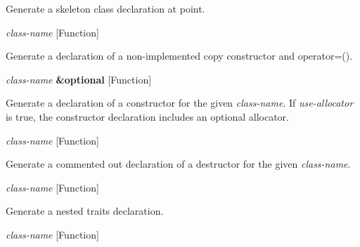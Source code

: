 \begin{doc-string}
Generate a skeleton class declaration at point.
\end{doc-string}

\vspace{1em}
\noindent
{}
\usebox{\funcname}\emph{class-name}
 \hfill [Function]

\begin{doc-string}
Generate a declaration of a non-implemented copy constructor and operator=().
\end{doc-string}

\vspace{1em}
\noindent
{}
\usebox{\funcname}\emph{class-name} \textbf{\&optional}
 \hfill [Function]
\hspace*{\wd\funcname}

\begin{doc-string}
Generate a declaration of a constructor for the given \emph{class-name}.  If
\emph{use-allocator} is true, the constructor declaration includes an optional
allocator.
\end{doc-string}

\vspace{1em}
\noindent
{}
\usebox{\funcname}\emph{class-name}
 \hfill [Function]

\begin{doc-string}
Generate a commented out declaration of a destructor for the given \emph{class-name}.
\end{doc-string}

\vspace{1em}
\noindent
{}
\usebox{\funcname}\emph{class-name}
 \hfill [Function]

\begin{doc-string}
Generate a nested traits declaration.
\end{doc-string}

\vspace{1em}
\noindent
{}
\usebox{\funcname}\emph{class-name}
 \hfill [Function]

